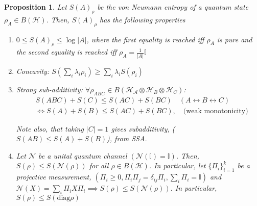 \documentclass[notoc]{tufte-book}
\newtheorem{proposition}[theorem]{Proposition}
\begin{document}
\begin{tcolorbox}[colframe=white,breakable, colback=black!5, arc=0pt, outer arc=0pt]
\begin{proposition}\label{prop:properties-of-entropy} Let $S(A)_{\rho}$ be the von Neumann entropy of a quantum state $\rho_A \in B(\mathcal{H})$. Then, $S(A)_{\rho}$ has the following properties
\begin{enumerate}
    \item $0\leq S(A)_{\rho} \leq \log{|A|}$, where the first equality is reached iff $\rho_A$ is pure and the second equality is reached iff $\rho_A = \frac{1}{|A|} \mathbb{I}$
    \item Concavity: $S(\sum_i \lambda_i \rho_i) \geq \sum_i \lambda_i S(\rho_i)$
    \item Strong sub-additivity: $\forall \rho_{ABC} \in B(\mathcal{H_A} \otimes \mathcal{H}_B \otimes \mathcal{H}_C)$:
    \begin{align}
        &S(ABC)+S(C) \leq S(AC)+S(BC) \quad (A \leftrightarrow B \leftrightarrow C)\\
        &\Leftrightarrow S(A)+S(B) \leq S(AC)+S(BC), \quad \text{(weak monotonicity)}
    \end{align}
    
    Note also, that taking $|C|=1$ gives subadditivity, ($S(AB) \leq S(A) +S(B)$), from SSA.
    
    \item Let $\mathcal{N}$ be a unital quantum channel $(\mathcal{N}(\mathbb{I})=\mathbb{I})$. Then, $S(\rho) \leq S(\mathcal{N}(\rho))$ for all $\rho \in B(\mathcal{H})$. In particular, let $\{\Pi_i\}_{i=1}^k$ be a projective measurement, $(\Pi_i \geq 0, \Pi_i \Pi_j =\delta_{ij} \Pi_i, \sum_i \Pi_i =\mathbb{I})$ and $\mathcal{N}(X)=\sum_i \Pi_i X \Pi_i \implies S(\rho) \leq S(\mathcal{N}(\rho))$. In particular, $S(\rho)\leq S(\text{diag}\rho)$
\end{enumerate}
\end{proposition}
\end{tcolorbox}
\end{document}
